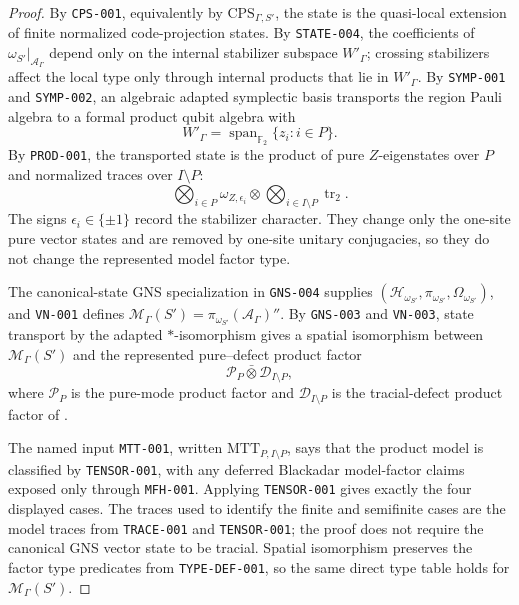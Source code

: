 \documentclass{article}
\newcommand{\cA}{\mathcal A}
\newcommand{\cD}{\mathcal D}
\newcommand{\cH}{\mathcal H}
\newcommand{\cM}{\mathcal M}
\newcommand{\cP}{\mathcal P}
\newcommand{\Ftwo}{\mathbb F_2}
\begin{document}
\begin{proof}
By \texttt{CPS-001}, equivalently by
\(\mathrm{CPS}_{\Gamma,S'}\), the state is the quasi-local extension of
finite normalized code-projection states.  By \texttt{STATE-004}, the
coefficients of
\(\omega_{S'}|_{\cA_\Gamma}\) depend only on the internal stabilizer subspace
\(W'_\Gamma\); crossing stabilizers affect the local type only through
internal products that lie in \(W'_\Gamma\).  By \texttt{SYMP-001} and
\texttt{SYMP-002}, an algebraic adapted symplectic basis transports the region
Pauli algebra to a formal product qubit algebra with
\[
  W'_\Gamma=\operatorname{span}_{\Ftwo}\{z_i:i\in P\}.
\]
By \texttt{PROD-001}, the transported state is the product of pure
\(Z\)-eigenstates over \(P\) and normalized traces over \(I\setminus P\):
\[
  \bigotimes_{i\in P}\omega_{Z,\epsilon_i}
  \otimes
  \bigotimes_{i\in I\setminus P}\operatorname{tr}_2 .
\]
The signs \(\epsilon_i\in\{\pm1\}\) record the stabilizer character.  They
change only the one-site pure vector states and are removed by one-site unitary
conjugacies, so they do not change the represented model factor type.

The canonical-state GNS specialization in \texttt{GNS-004} supplies
\((\cH_{\omega_{S'}},\pi_{\omega_{S'}},\Omega_{\omega_{S'}})\), and
\texttt{VN-001} defines
\(\cM_\Gamma(S')=\pi_{\omega_{S'}}(\cA_\Gamma)''\).  By \texttt{GNS-003} and
\texttt{VN-003}, state transport by the adapted \(*\)-isomorphism gives a
spatial isomorphism between \(\cM_\Gamma(S')\) and the represented
pure--defect product factor
\[
  \cP_P\bar\otimes\cD_{I\setminus P},
\]
where \(\cP_P\) is the pure-mode product factor and \(\cD_{I\setminus P}\) is
the tracial-defect product factor of
.

The named input \texttt{MTT-001}, written
\(\mathrm{MTT}_{P,I\setminus P}\), says that the product model is classified
by \texttt{TENSOR-001}, with any deferred Blackadar model-factor claims
exposed only through \texttt{MFH-001}.  Applying \texttt{TENSOR-001} gives
exactly the four displayed cases.  The traces used
to identify the finite and semifinite cases are the model traces from
\texttt{TRACE-001} and \texttt{TENSOR-001}; the proof does not require the
canonical GNS vector state to be tracial.  Spatial isomorphism preserves the
factor type predicates from \texttt{TYPE-DEF-001}, so the same direct type
table holds for \(\cM_\Gamma(S')\).
\end{proof}
\end{document}
